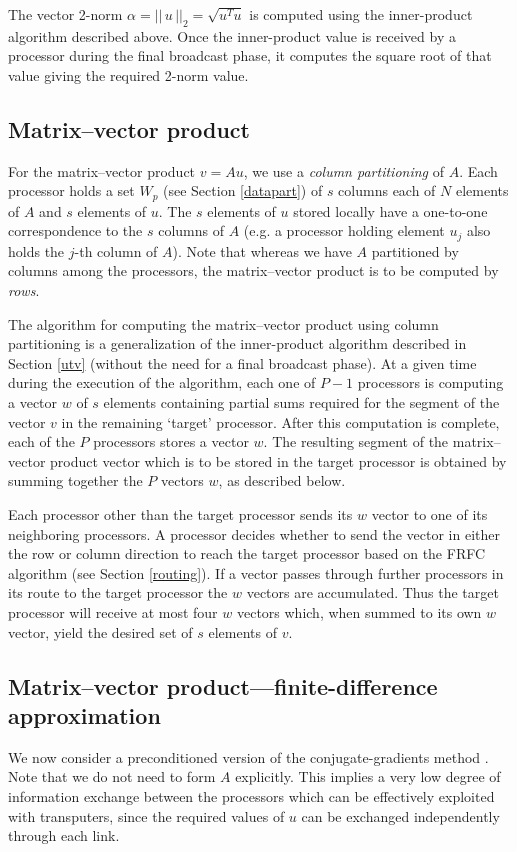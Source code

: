 \documentclass{ecai}
\begin{document}
The vector 2-norm $\alpha=||\,u\,||_{2}=\sqrt{u^{T}u}$ is computed
using the inner-product algorithm described above. Once the
inner-product value is received by a processor during the final
broadcast phase, it computes the square root of that value giving the
required 2-norm value.

\subsection{Matrix--vector product}
\label{mv}
For the matrix--vector product $v=Au$, we use a \emph{column
  partitioning} of $A$.  Each processor holds a set $W_{p}$ (see
Section \ref{datapart}) of $s$ columns each of $N$ elements of $A$ and
$s$ elements of $u$.  The $s$ elements of $u$ stored locally have a
one-to-one correspondence to the $s$ columns of $A$ (e.g. a processor
holding element $u_{j}$ also holds the $j$-th column of $A$). Note
that whereas we have $A$ partitioned by columns among the processors,
the matrix--vector product is to be computed by \emph{rows}.

The algorithm for computing the matrix--vector product using column
partitioning is a generalization of the inner-product algorithm
described in Section \ref{utv} (without the need for a final broadcast
phase). At a given time during the execution of the algorithm, each
one of $P-1$ processors is computing a vector $w$ of $s$ elements
containing partial sums required for the segment of the vector $v$ in
the remaining `target' processor.  After this computation is complete,
each of the $P$ processors stores a vector $w$.  The resulting segment
of the matrix--vector product vector which is to be stored in the
target processor is obtained by summing together the $P$ vectors $w$,
as described below.

Each processor other than the target processor sends its $w$ vector to
one of its neighboring processors. A processor decides whether to send
the vector in either the row or column direction to reach the target
processor based on the FRFC algorithm (see Section \ref{routing}). If
a vector passes through further processors in its route to the target
processor the $w$ vectors are accumulated. Thus the target processor
will receive at most four $w$ vectors which, when summed to its own
$w$ vector, yield the desired set of $s$ elements of $v$.

\subsection{Matrix--vector product---finite-difference approximation}
We now consider a preconditioned version of the conjugate-gradients
method \cite{kn:Golub89}. Note that we do not need to form $A$
explicitly.  This implies a very low degree of information exchange
between the processors which can be effectively exploited with
transputers, since the required values of $u$ can be exchanged
independently through each link.
\end{document}
